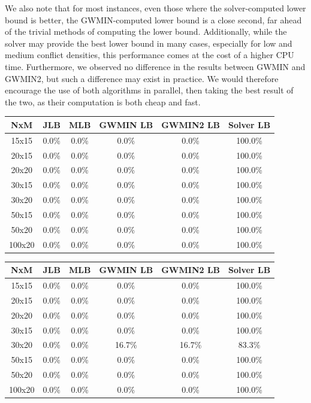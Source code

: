 \documentclass{mimosis}
\begin{document}
We also note that for most instances, even those where the solver-computed lower bound is better, the GWMIN-computed lower bound is a close second, far ahead of the trivial methods of computing the lower bound. Additionally, while the solver may provide the best lower bound in many cases, especially for low and medium conflict densities, this performance comes at the cost of a higher CPU time. Furthermore, we observed no difference in the results between GWMIN and GWMIN2, but such a difference may exist in practice. We would therefore encourage the use of both algorithms in parallel, then taking the best result of the two, as their computation is both cheap and fast.

\begin{table}[h]
\centering
\begin{tabular}{c|ccccc}
NxM & JLB & MLB & GWMIN LB & GWMIN2 LB & Solver LB \\
\hline
15x15 & 0.0\% & 0.0\% & 0.0\% & 0.0\% & 100.0\% \\
20x15 & 0.0\% & 0.0\% & 0.0\% & 0.0\% & 100.0\% \\
20x20 & 0.0\% & 0.0\% & 0.0\% & 0.0\% & 100.0\% \\
30x15 & 0.0\% & 0.0\% & 0.0\% & 0.0\% & 100.0\% \\
30x20 & 0.0\% & 0.0\% & 0.0\% & 0.0\% & 100.0\% \\
50x15 & 0.0\% & 0.0\% & 0.0\% & 0.0\% & 100.0\% \\
50x20 & 0.0\% & 0.0\% & 0.0\% & 0.0\% & 100.0\% \\
100x20 & 0.0\% & 0.0\% & 0.0\% & 0.0\% & 100.0\% \\
\end{tabular}
\label{tab:lbprob02}
\end{table}

\begin{table}[h]
\centering
\begin{tabular}{c|ccccc}
NxM & JLB & MLB & GWMIN LB & GWMIN2 LB & Solver LB \\
\hline
15x15 & 0.0\% & 0.0\% & 0.0\% & 0.0\% & 100.0\% \\
20x15 & 0.0\% & 0.0\% & 0.0\% & 0.0\% & 100.0\% \\
20x20 & 0.0\% & 0.0\% & 0.0\% & 0.0\% & 100.0\% \\
30x15 & 0.0\% & 0.0\% & 0.0\% & 0.0\% & 100.0\% \\
30x20 & 0.0\% & 0.0\% & 16.7\% & 16.7\% & 83.3\% \\
50x15 & 0.0\% & 0.0\% & 0.0\% & 0.0\% & 100.0\% \\
50x20 & 0.0\% & 0.0\% & 0.0\% & 0.0\% & 100.0\% \\
100x20 & 0.0\% & 0.0\% & 0.0\% & 0.0\% & 100.0\% \\
\end{tabular}
\label{tab:lbprob05}
\end{table}
\end{document}
